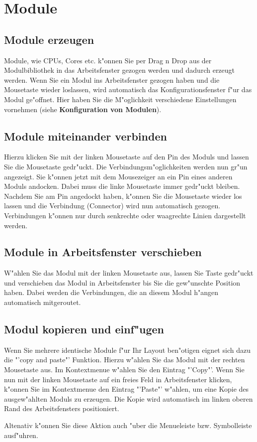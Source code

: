 \documentclass[a4paper,titlepage,12pt,ngerman]{scrbook}
\begin{document}

\section{Module}

\subsection{Module erzeugen}
Module, wie CPUs, Cores etc. k"onnen Sie per Drag n Drop aus der Modulbibliothek in das Arbeitsfenster gezogen werden und dadurch erzeugt werden. Wenn Sie ein Modul ins Arbeitsfenster gezogen haben und die Mousetaste wieder loslassen, wird automatisch das Konfigurationsfenster f"ur das Modul ge"offnet. Hier haben Sie die M"oglichkeit verschiedene Einstellungen vornehmen (siehe {\bf Konfiguration von Modulen}).


\subsection{Module miteinander verbinden}
Hierzu klicken Sie mit der linken Mousetaste auf den Pin des Moduls und lassen Sie die Mousetaste gedr"uckt. Die Verbindungsm"oglichkeiten werden nun gr"un angezeigt. Sie k"onnen jetzt mit dem Mousezeiger an ein Pin eines anderen Moduls andocken. Dabei muss die linke Mousetaste immer gedr"uckt bleiben. Nachdem Sie am Pin angedockt haben, k"onnen Sie die Mousetaste wieder los lassen und die Verbindung (Connector) wird nun automatisch gezogen. Verbindungen k"onnen nur durch senkrechte oder waagrechte Linien dargestellt werden.


\subsection{Module in Arbeitsfenster verschieben}
W"ahlen Sie das Modul mit der linken Mousetaste aus, lassen Sie Taste gedr"uckt und verschieben das Modul in Arbeitsfenster bis Sie die gew"unschte Position haben. Dabei werden die Verbindungen, die an diesem Modul h"angen automatisch mitgeroutet.


\subsection{Modul kopieren und einf"ugen}
Wenn Sie mehrere identische Module f"ur Ihr Layout ben"otigen eignet sich dazu die "'copy and paste"' Funktion. Hierzu w"ahlen Sie das Modul mit der rechten Mousetaste aus. Im Kontextmenue w"ahlen Sie den Eintrag "'Copy"'. Wenn Sie nun mit der linken Mousetaste auf ein freies Feld in Arbeitsfenster
klicken, k"onnen Sie im Kontextmenue den Eintrag "'Paste"' w"ahlen, um eine Kopie des ausgew"ahlten Moduls zu erzeugen.
Die Kopie wird automatisch im linken oberen Rand des Arbeitsfensters positioniert.\par
Altenativ k"onnen Sie diese Aktion auch "uber die Menueleiste bzw. Symbolleiste ausf"uhren. 
\end{document}
